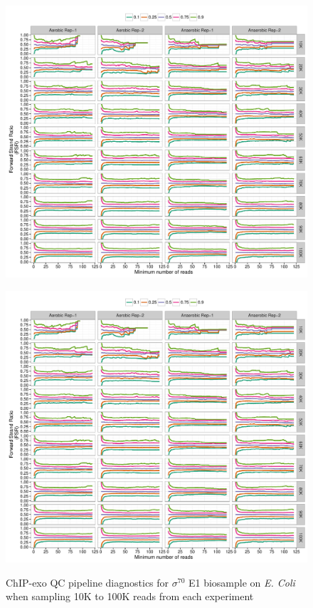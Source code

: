 \documentclass{article}
\begin{document}
\begin{figure}[H]
  \centering
  \includegraphics[width =.9\textheight,angle = 90,page =
1]{figures/supplement/QC_samp/Sig70_sample_bios1_strand_imbalance.pdf} 
\end{figure}

\begin{figure}[H]
  \centering
  \includegraphics[width =.9\textheight,angle = 90,page =
3]{figures/supplement/QC_samp/Sig70_sample_bios1_strand_imbalance.pdf} 
  \label{sfig:qcsamp1}
  \caption{ChIP-exo QC pipeline diagnostics for $\sigma^{70}$ E1
    biosample on \emph{E. Coli} when sampling 10K to 100K reads from
    each experiment}
\end{figure}
\end{document}
